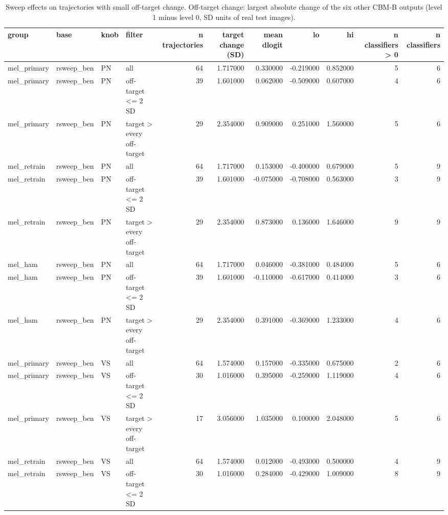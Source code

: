 \begin{table}
\caption{Sweep effects on trajectories with small off-target change. Off-target change: largest absolute change of the six other CBM-B outputs (level 1 minus level 0, SD units of real test images).}
\label{tab:T8_preservation}
\begin{tabular}{llllrrrrrrr}
\toprule
group & base & knob & filter & n trajectories & target change (SD) & mean dlogit & lo & hi & n classifiers > 0 & n classifiers \\
\midrule
mel\_primary & rsweep\_ben & PN & all & 64 & 1.717000 & 0.330000 & -0.219000 & 0.852000 & 5 & 6 \\
mel\_primary & rsweep\_ben & PN & off-target <= 2 SD & 39 & 1.601000 & 0.062000 & -0.509000 & 0.607000 & 4 & 6 \\
mel\_primary & rsweep\_ben & PN & target > every off-target & 29 & 2.354000 & 0.909000 & 0.251000 & 1.560000 & 5 & 6 \\
mel\_retrain & rsweep\_ben & PN & all & 64 & 1.717000 & 0.153000 & -0.400000 & 0.679000 & 5 & 9 \\
mel\_retrain & rsweep\_ben & PN & off-target <= 2 SD & 39 & 1.601000 & -0.075000 & -0.708000 & 0.563000 & 3 & 9 \\
mel\_retrain & rsweep\_ben & PN & target > every off-target & 29 & 2.354000 & 0.873000 & 0.136000 & 1.646000 & 9 & 9 \\
mel\_ham & rsweep\_ben & PN & all & 64 & 1.717000 & 0.046000 & -0.381000 & 0.484000 & 5 & 6 \\
mel\_ham & rsweep\_ben & PN & off-target <= 2 SD & 39 & 1.601000 & -0.110000 & -0.617000 & 0.414000 & 3 & 6 \\
mel\_ham & rsweep\_ben & PN & target > every off-target & 29 & 2.354000 & 0.391000 & -0.369000 & 1.233000 & 4 & 6 \\
mel\_primary & rsweep\_ben & VS & all & 64 & 1.574000 & 0.157000 & -0.335000 & 0.675000 & 2 & 6 \\
mel\_primary & rsweep\_ben & VS & off-target <= 2 SD & 30 & 1.016000 & 0.395000 & -0.259000 & 1.119000 & 4 & 6 \\
mel\_primary & rsweep\_ben & VS & target > every off-target & 17 & 3.056000 & 1.035000 & 0.100000 & 2.048000 & 5 & 6 \\
mel\_retrain & rsweep\_ben & VS & all & 64 & 1.574000 & 0.012000 & -0.493000 & 0.500000 & 4 & 9 \\
mel\_retrain & rsweep\_ben & VS & off-target <= 2 SD & 30 & 1.016000 & 0.284000 & -0.429000 & 1.009000 & 8 & 9 \\

\end{tabular}
\end{table}
